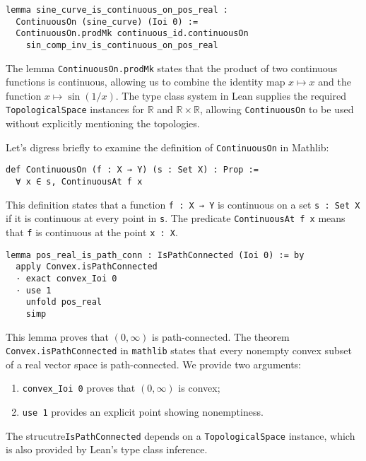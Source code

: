 \begin{lstlisting}[language=lean]
lemma sine_curve_is_continuous_on_pos_real :
  ContinuousOn (sine_curve) (Ioi 0) :=
  ContinuousOn.prodMk continuous_id.continuousOn
    sin_comp_inv_is_continuous_on_pos_real
\end{lstlisting}
The lemma \lstinline[language=lean]|ContinuousOn.prodMk| states that the product of two continuous functions
is continuous, allowing us to combine the identity map $x \mapsto x$ and the function
$x \mapsto \sin(1/x)$.
The type class system in Lean supplies the required \lstinline[language=lean]|TopologicalSpace| instances
for $\mathbb{R}$ and $\mathbb{R} \times \mathbb{R}$, allowing \lstinline[language=lean]|ContinuousOn| to be used
without explicitly mentioning the topologies.

Let's digress briefly to examine the definition of \lstinline[language=lean]|ContinuousOn| in Mathlib:
\begin{lstlisting}[language=lean]
def ContinuousOn (f : X → Y) (s : Set X) : Prop :=
  ∀ x ∈ s, ContinuousAt f x
\end{lstlisting}
This definition states that a function \lstinline[language=lean]|f : X → Y| is continuous on a set
\lstinline[language=lean]|s : Set X| if it is continuous at every point in \lstinline[language=lean]|s|.
The predicate \lstinline[language=lean]|ContinuousAt f x| 
means that \lstinline[language=lean]|f| is continuous at the point \lstinline[language=lean]|x : X|.


\begin{lstlisting}[language=lean]
lemma pos_real_is_path_conn : IsPathConnected (Ioi 0) := by
  apply Convex.isPathConnected
  · exact convex_Ioi 0
  · use 1
    unfold pos_real
    simp
\end{lstlisting}

This lemma proves that $(0, \infty)$ is path-connected. The theorem
\lstinline[language=lean]|Convex.isPathConnected| in \lstinline[language=lean]|mathlib| 
states that every nonempty convex
subset of a real vector space is path-connected. We provide two arguments:
\begin{enumerate}
  \item \lstinline[language=lean]|convex_Ioi 0| proves that $(0, \infty)$ is convex;
  \item \lstinline[language=lean]|use 1| provides an explicit point showing nonemptiness.
\end{enumerate}
The strucutre\lstinline[language=lean]|IsPathConnected| depends on a \lstinline[language=lean]|TopologicalSpace| 
instance,
which is also provided by Lean’s type class inference.

